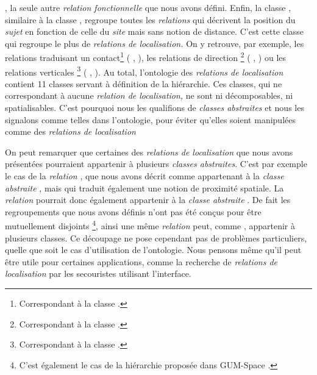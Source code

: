 ,
la seule autre \emph{relation fonctionnelle} que nous avons défini.
Enfin, la classe
,
similaire à la classe
, regroupe
toutes les \emph{relations} qui décrivent la position du \emph{sujet}
en fonction de celle du \emph{site} mais sans notion de
distance. C'est cette classe qui regroupe le plus de \emph{relations
  de localisation.} On y retrouve, par exemple, les relations
traduisant un contact\footnote{Correspondant à la classe
  .} (\eg
{},
), les relations de direction
\footnote{Correspondant à la classe
  .} (\eg
{}, ) ou
les relations verticales \footnote{Correspondant à la classe
  .} (\eg
{}, ). Au
total, l'ontologie des \emph{relations de localisation} contient 11
classes servant à définition de la hiérarchie. Ces classes, qui ne
correspondant à aucune \emph{relation de localisation,} ne sont ni
décomposables, ni spatialisables. C'est pourquoi nous les qualifions
de \emph{classes abstraites} et nous les signalons comme telles dans
l'ontologie, pour éviter qu'elles soient manipulées comme des
\emph{relations de localisation} 

On peut remarquer que certaines des \emph{relations de localisation}
que nous avons présentées pourraient appartenir à plusieurs
\emph{classes abstraites}. C'est par exemple le cas de la
\emph{relation} , que nous avons décrit comme
appartenant à la \emph{classe abstraite}
, mais qui
traduit également une notion de proximité spatiale. La \emph{relation}
 pourrait donc également appartenir à la
\emph{classe abstraite}
. De fait les
regroupements que nous avons définis n'ont pas été conçus pour être
mutuellement disjoints \footnote{C'est également le cas de la
  hiérarchie proposée dans GUM-Space \autocite{Bateman2010}.}, ainsi
une même \emph{relation} peut, comme ,
appartenir à plusieurs classes. Ce découpage ne pose cependant pas de
problèmes particuliers, quelle que soit le cas d'utilisation de
l'ontologie. Nous pensons même qu'il peut être utile pour certaines
applications, comme la recherche de \emph{relations de localisation}
par les secouristes utilisant l'interface.

